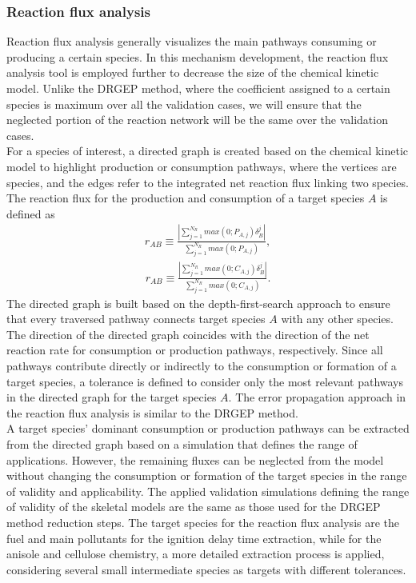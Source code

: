\begin{refsection}
\subsubsection{Reaction flux analysis}
Reaction flux analysis generally visualizes the main pathways consuming or producing a certain species. In this mechanism development, the reaction flux analysis tool is employed further to decrease the size of the chemical kinetic model. Unlike the DRGEP method, where the coefficient assigned to a certain species is maximum over all the validation cases, we will ensure that the neglected portion of the reaction network will be the same over the validation cases.
\\
For a species of interest, a directed graph is created based on the chemical kinetic model to highlight production or consumption pathways, where the vertices are species, and the edges refer to the integrated net reaction flux linking two species. The reaction flux for the production and consumption of a target species $A$ is defined as
\begin{align}
r_{AB} \equiv \frac{|\sum_{j=1}^{N_R} max(0; P_{A,j})\delta_{B}^{j}|}{\sum_{j=1}^{N_R} max(0; P_{A,j})},
\end{align}
\begin{align}
r_{AB} \equiv \frac{|\sum_{j=1}^{N_R} max(0; C_{A,j})\delta_{B}^{j}|}{\sum_{j=1}^{N_R} max(0; C_{A,j})}.
\end{align}
The directed graph is built based on the depth-first-search approach to ensure that every traversed pathway connects target species $A$ with any other species. The direction of the directed graph coincides with the direction of the net reaction rate for consumption or production pathways, respectively. Since all pathways contribute directly or indirectly to the consumption or formation of a target species, a tolerance is defined to consider only the most relevant pathways in the directed graph for the target species $A$. The error propagation approach in the reaction flux analysis is similar to the DRGEP method.
\\
A target species' dominant consumption or production pathways can be extracted from the directed graph based on a simulation that defines the range of applications. However, the remaining fluxes can be neglected from the model without changing the consumption or formation of the target species in the range of validity and applicability. The applied validation simulations defining the range of validity of the skeletal models are the same as those used for the DRGEP method reduction steps. The target species for the reaction flux analysis are the fuel and main pollutants for the ignition delay time extraction, while for the anisole and cellulose chemistry, a more detailed extraction process is applied, considering several small intermediate species as targets with different tolerances.



\end{refsection}

